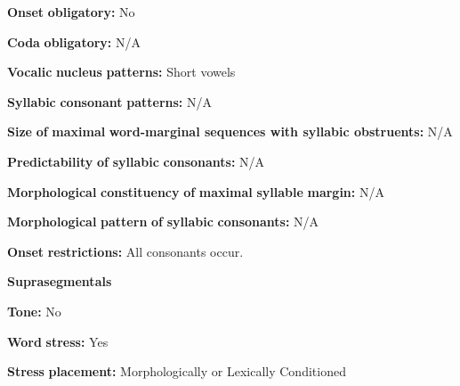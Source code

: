 \begin{styleBody}
\textbf{Onset} \textbf{obligatory:} No
\end{styleBody}

\begin{styleBody}
\textbf{Coda} \textbf{obligatory:} N/A
\end{styleBody}

\begin{styleBody}
\textbf{Vocalic} \textbf{nucleus} \textbf{patterns:} Short vowels
\end{styleBody}

\begin{styleBody}
\textbf{Syllabic} \textbf{consonant} \textbf{patterns:} N/A
\end{styleBody}

\begin{styleBody}
\textbf{Size} \textbf{of} \textbf{maximal} \textbf{word{}-marginal sequences with syllabic obstruents:} N/A
\end{styleBody}

\begin{styleBody}
\textbf{Predictability} \textbf{of} \textbf{syllabic} \textbf{consonants:} N/A
\end{styleBody}

\begin{styleBody}
\textbf{Morphological} \textbf{constituency} \textbf{of} \textbf{maximal} \textbf{syllable} \textbf{margin:} N/A
\end{styleBody}

\begin{styleBody}
\textbf{Morphological} \textbf{pattern} \textbf{of} \textbf{syllabic} \textbf{consonants:} N/A
\end{styleBody}

\begin{styleBody}
\textbf{Onset} \textbf{restrictions:} All consonants occur.
\end{styleBody}

\begin{styleBody}
\textbf{Suprasegmentals}
\end{styleBody}

\begin{styleBody}
\textbf{Tone:} No
\end{styleBody}

\begin{styleBody}
\textbf{Word} \textbf{stress:} Yes
\end{styleBody}

\begin{styleBody}
\textbf{Stress} \textbf{placement:} Morphologically or Lexically Conditioned
\end{styleBody}

